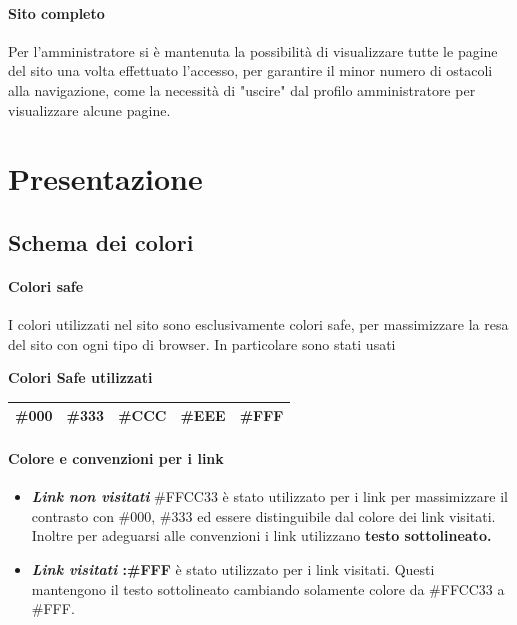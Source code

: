 \documentclass[12pt,a4paper]{article}
\begin{document}
\paragraph{Sito completo} Per l'amministratore si è mantenuta la possibilità di visualizzare tutte le pagine del sito una volta effettuato l'accesso, per garantire il minor numero di ostacoli alla navigazione, come la necessità di "uscire" dal profilo amministratore per visualizzare alcune pagine.

\section{Presentazione}
\subsection{Schema dei colori}
\paragraph{Colori safe}I colori utilizzati nel sito sono esclusivamente colori safe, per massimizzare la resa del sito con ogni tipo di browser.  In particolare sono stati usati
\begin{center}
	\textbf{Colori Safe utilizzati}
	
	\begin{tabular}{c c c c c}
		\midrule  \#000 & \#333 & \#CCC & \#EEE  &  \#FFF \\ \midrule 
	\end{tabular} 
\end{center}

\paragraph{Colore e convenzioni per i link}
\begin{itemize}
	\item \textit{\textbf{Link non visitati}} \#FFCC33 è stato utilizzato per i link per massimizzare il contrasto con \#000, \#333 ed essere distinguibile dal colore dei link visitati. Inoltre per adeguarsi alle convenzioni i link utilizzano \textbf{testo sottolineato.}
	\item \textbf{\textit{Link visitati} :\#FFF }è stato utilizzato per i link visitati. Questi mantengono il testo sottolineato cambiando solamente colore da \#FFCC33 a \#FFF. 
\end{itemize}
\end{document}
